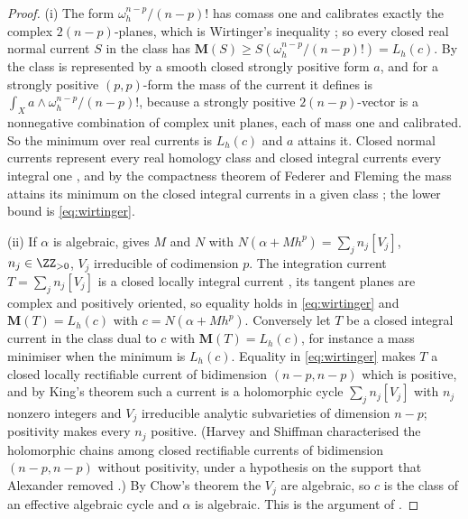 \begin{proof}
(i) The form $\omega_{h}^{n-p}/(n-p)!$ has comass one and calibrates exactly
the complex $2(n-p)$-planes, which is Wirtinger's inequality
\cite[1.8.2]{Fed69}; so every closed real normal current $S$ in the class has
$\mathbf{M}(S)\ge S(\omega_{h}^{n-p}/(n-p)!)=L_{h}(c)$. By
 the class is represented by a smooth closed
strongly positive form $a$, and for a strongly positive $(p,p)$-form the mass of
the current it defines is $\int_{X}a\wedge\omega_{h}^{n-p}/(n-p)!$, because a
strongly positive $2(n-p)$-vector is a nonnegative combination of complex unit
planes, each of mass one and calibrated. So the minimum over real currents is
$L_{h}(c)$ and $a$ attains it. Closed normal currents represent every real
homology class and closed integral currents every integral one
\cite[5.11]{FF60}, and by the compactness theorem of Federer and Fleming the
mass attains its minimum on the closed integral currents in a given class
\cite[9.6]{FF60}; the lower bound is \eqref{eq:wirtinger}.

(ii) If $\alpha$ is algebraic,  gives $M$ and $N$ with
$N(\alpha+Mh^{p})=\sum_{j}n_{j}[V_{j}]$, $n_{j}\in\ZZ_{>0}$, $V_{j}$
irreducible of codimension $p$. The integration current $T=\sum_{j}n_{j}[V_{j}]$
is a closed locally integral current \cite[Theorem~3.1.1]{Kin71}, its tangent
planes are complex and positively oriented, so equality holds in
\eqref{eq:wirtinger} and $\mathbf{M}(T)=L_{h}(c)$ with $c=N(\alpha+Mh^{p})$.
Conversely let $T$ be a closed integral current in the class dual to $c$ with
$\mathbf{M}(T)=L_{h}(c)$, for instance a mass minimiser when the minimum is
$L_{h}(c)$. Equality in \eqref{eq:wirtinger} makes $T$ a closed locally
rectifiable current of bidimension $(n-p,n-p)$ which is positive, and by
King's theorem \cite[Theorem~5.2.1]{Kin71} such a current is a holomorphic
cycle $\sum_{j}n_{j}[V_{j}]$ with $n_{j}$ nonzero integers and $V_{j}$
irreducible analytic subvarieties of dimension $n-p$; positivity makes every
$n_{j}$ positive. (Harvey and Shiffman characterised the holomorphic chains
among closed rectifiable currents of bidimension $(n-p,n-p)$ without
positivity, under a hypothesis on the support that Alexander removed
\cite{HS74,Ale97}.) By Chow's theorem \cite[p.~167]{GH78} the $V_{j}$
are algebraic, so $c$ is the class of an effective algebraic cycle and $\alpha$
is algebraic. This is the argument of \cite[Proposition~6.13]{HL09}.


\end{proof}
